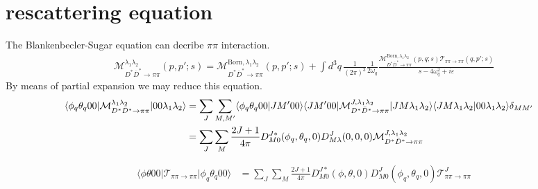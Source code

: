 \documentclass[aps,prd,preprintnumbers,showpacs,showkeys,nofootinbib,
superscriptaddress,fleqn,floatfix,tightenlines, 10pt]{revtex4-1}
\begin{document}




\newpage
\section{rescattering equation}
The Blankenbecler-Sugar equation can decribe $\pi\pi$ interaction.
\begin{align} \label{BbS1}
\mathcal{M}_{D^* \bar{D}^* \rightarrow \pi\pi}^
{\lambda_1 \lambda_2} (p,p';s) =
\mathcal{M}_{D^* \bar{D}^* \rightarrow \pi\pi}^
{\mathrm{Born},\lambda_1 \lambda_2} (p,p';s)
+ \int{d^3q\, \frac{1}{(2\pi)^3} \frac{1}{2\omega_q}
\frac{\mathcal{M}_{D^* \bar{D}^* \rightarrow \pi\pi}^
{\mathrm{Born},\lambda_1 \lambda_2}(p,q;s)
\mathcal{T}_{\pi\pi \rightarrow \pi\pi}(q,p';s)}
{s - 4\omega_q^2 + i \varepsilon}}
\end{align}
By means of partial expansion we may reduce this equation.
\begin{align}
\langle \phi_q \theta_q 0 0 |
\mathcal{M}_{D^* \bar{D}^* \rightarrow \pi\pi}^{\lambda_1 \lambda_2}
| 0 0 \lambda_1 \lambda_2 \rangle &= \sum_{J} \sum_{M,M'}
\langle \phi_q \theta_q 0 0 | J M' 0 0 \rangle
\langle J M' 0 0 | \mathcal{M}_{D^* \bar{D}^* \rightarrow \pi\pi}^{J, \lambda_1 \lambda_2}
| J M \lambda_1 \lambda_2 \rangle \langle J M \lambda_1 \lambda_2 |
0 0 \lambda_1 \lambda_2 \rangle \delta_{MM'} \cr
&=\sum_J \sum_{M} \frac{2J+1}{4\pi} D^{J*}_{M0} (\phi_q, \theta_q, 0)
D^{J}_{M \lambda} (0,0,0)
\mathcal{M}_{D^* \bar{D}^* \rightarrow \pi\pi}^{J, \lambda_1 \lambda_2}
\end{align}

\begin{align}
\langle \phi \theta 0 0 | \mathcal{T}_{\pi\pi \rightarrow \pi\pi}
| \phi_q \theta_q 0 0 \rangle &=
\sum_{J} \sum_{M} \frac{2J+1}{4\pi}
D^{J*}_{M 0} (\phi, \theta, 0) D^J_{M 0} (\phi_q, \theta_q, 0)
\mathcal{T}_{\pi\pi \rightarrow \pi\pi}^J
\end{align}
\end{document}
